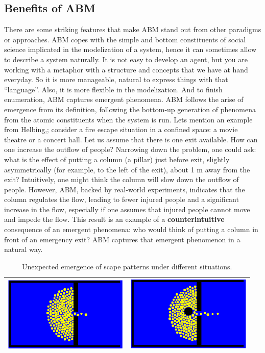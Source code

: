 \documentclass[11pt,oneside,a4paper,openright]{report}
\begin{document}
\subsection{Benefits of ABM}
There are  some striking features that make ABM stand out from other paradigms or approaches. ABM copes with the simple and bottom constituents of social science implicated in the modelization of a system, hence it can sometimes allow to describe a system naturally. It is not easy to develop an agent, but you are working with a metaphor  with a structure and concepts that we have at hand everyday. So it is more manageable, natural to express things with that “language”. Also, it is more flexible in the modelization. And to finish enumeration, ABM captures emergent phenomena. ABM follows the arise of emergence from its definition, following the bottom-up generation of phenomena from the atomic constituents when the system is run.
Lets mention an example from Helbing,\cite{Helbing2000}; consider a fire escape situation in a confined space: a movie theatre or a concert hall. Let us assume that there is one exit available. How can one increase the outflow of people? Narrowing down the problem, one could ask: what is the effect of putting a column (a pillar) just before exit, slightly asymmetrically (for example, to the left of the exit), about 1 m away from the exit? Intuitively, one might think the column will slow down the outflow of people. However, ABM, backed by real-world experiments, indicates that the column regulates the flow, leading to fewer injured people and a significant increase in the flow, especially if one assumes that injured people cannot move and impede the flow. This result is an example of a \textbf{counterintuitive} consequence of an emergent phenomena: who would think of putting a column in front of an emergency exit? ABM captures that emergent phenomenon in a natural way.\\

	\begin{table}[h]
	\centering
	\begin{tabular}{|c|c|}
		\hline
		\includegraphics[width=60mm,keepaspectratio=true]{figures/column1.png}
		&
		\includegraphics[width=60mm,keepaspectratio=true]{figures/column2.png}\\
		\hline
	\end{tabular}
	\caption{Unexpected emergence of scape patterns under different situations.}
	\label{tab:columnExit}
	\end{table}
\end{document}
